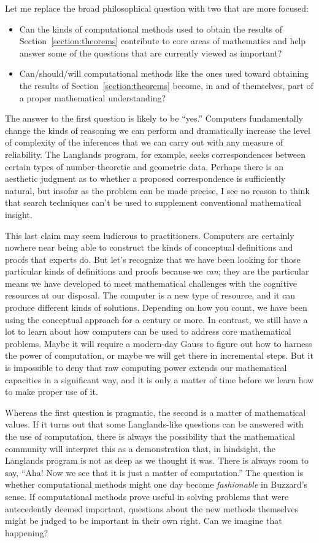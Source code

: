 \documentclass[12pt]{amsart}
\theoremstyle{definition}
\theoremstyle{remark}
\numberwithin{equation}{section}
\begin{document}
Let me replace the broad philosophical question with two that are more focused:
\begin{itemize}
  \item Can the kinds of computational methods used to obtain the results of Section~\ref{section:theorems} contribute to core areas of mathematics and help answer some of the questions that are currently viewed as important?
  \item Can/should/will computational methods like the ones used toward obtaining the results of Section~\ref{section:theorems} become, in and of themselves, part of a proper mathematical understanding?
\end{itemize}

The answer to the first question is likely to be ``yes.'' Computers fundamentally change the kinds of reasoning we can perform and dramatically increase the level of complexity of the inferences that we can carry out with any measure of reliability. The Langlands program, for example, seeks correspondences between certain types of number-theoretic and geometric data. Perhaps there is an aesthetic judgment as to whether a proposed correspondence is sufficiently natural, but insofar as the problem can be made precise, I see no reason to think that search techniques can't be used to supplement conventional mathematical insight.

This last claim may seem ludicrous to practitioners. Computers are certainly nowhere near being able to construct the kinds of conceptual definitions and proofs that experts do. But let's recognize that we have been looking for those particular kinds of definitions and proofs because we \emph{can}; they are the particular means we have developed to meet mathematical challenges with the cognitive resources at our disposal. The computer is a new type of resource, and it can produce different kinds of solutions. Depending on how you count, we have been using the conceptual approach for a century or more. In contrast, we still have a lot to learn about how computers can be used to address core mathematical problems. Maybe it will require a modern-day Gauss to figure out how to harness the power of computation, or maybe we will get there in incremental steps. But it is impossible to deny that raw computing power extends our mathematical capacities in a significant way, and it is only a matter of time before we learn how to make proper use of it.

Whereas the first question is pragmatic, the second is a matter of mathematical values. If it turns out that some Langlands-like questions can be answered with the use of computation, there is always the possibility that the mathematical community will interpret this as a demonstration that, in hindsight, the Langlands program is not as deep as we thought it was. There is always room to say, ``Aha! Now we see that it is just a matter of computation.'' The question is whether computational methods might one day become \emph{fashionable} in Buzzard's sense. If computational methods prove useful in solving problems that were antecedently deemed important, questions about the new methods themselves might be judged to be important in their own right. Can we imagine that happening?
\end{document}
